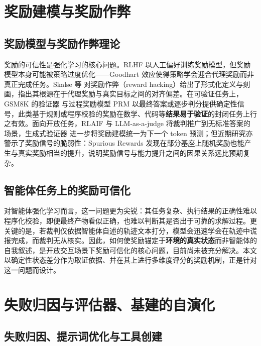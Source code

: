 \section{奖励建模与奖励作弊}

\subsection{奖励模型与奖励作弊理论}

奖励的可信性是强化学习的核心问题。RLHF 以人工偏好训练奖励模型，但奖励模型本身可能被策略过度优化——Goodhart 效应使得策略学会迎合代理奖励而非真正完成任务。Skalse 等 对奖励作弊（reward hacking）给出了形式化定义与刻画，指出其根源在于代理奖励与真实目标之间的对齐偏差。在可验证任务上，GSM8K 的验证器 与过程奖励模型 PRM 以最终答案或逐步判分提供确定性信号，此类基于规则或程序校验的奖励在数学、代码等\textbf{结果易于验证}的封闭任务上行之有效。面向开放任务，RLAIF 与 LLM-as-a-judge 将裁判推广到无标准答案的场景，生成式验证器 进一步将奖励建模统一为下一个 token 预测；但近期研究亦警示了奖励信号的脆弱性：Spurious Rewards 发现在部分基座上随机奖励也能产生与真实奖励相当的提升，说明奖励信号与能力提升之间的因果关系远比预期复杂。

\subsection{智能体任务上的奖励可信化}

对智能体强化学习而言，这一问题更为尖锐：其任务复杂、执行结果的正确性难以程序化校验，即便最终产物看似正确，也难以判断其是否出于可靠的求解过程。更关键的是，若裁判仅依据智能体自述的轨迹文本打分，模型会迅速学会在轨迹中谎报完成，而裁判无从核实。因此，如何使奖励锚定于\textbf{环境的真实状态}而非智能体的自我叙述，是开放交互场景下奖励可信化的核心问题，目前尚未被充分解决。本文以确定性状态差分作为取证依据、并在其上进行多维度评分的奖励机制，正是针对这一问题而设计。

\section{失败归因与评估器、基建的自演化}

\subsection{失败归因、提示词优化与工具创建}


